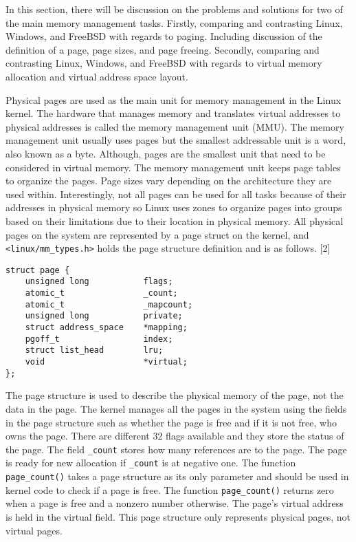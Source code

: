 \documentclass[letterpaper,10pt,draftclsnofoot,onecolumn,]{IEEEtran}
\begin{document}

In this section, there will be discussion on the problems and solutions for two of the main memory management tasks. Firstly, comparing and contrasting Linux, Windows, and FreeBSD with regards to paging. Including discussion of the definition of a page, page sizes, and page freeing. Secondly, comparing and contrasting Linux, Windows, and FreeBSD with regards to virtual memory allocation and virtual address space layout.

Physical pages are used as the main unit for memory management in the Linux kernel. The hardware that manages memory and translates virtual addresses to physical addresses is called the memory management unit (MMU). The memory management unit usually uses pages but the smallest addressable unit is a word, also known as a byte. Although, pages are the smallest unit that need to be considered in virtual memory. The memory management unit keeps page tables to organize the pages. Page sizes vary depending on the architecture they are used within. Interestingly, not all pages can be used for all tasks because of their addresses in physical memory so Linux uses zones to organize pages into groups based on their limitations due to their location in physical memory. All physical pages on the system are represented by a page struct on the kernel, and \verb|<linux/mm_types.h>| holds the page structure definition and is as follows. [2]
\begin{lstlisting}
struct page {
	unsigned long			flags;
    atomic_t				_count;
    atomic_t				_mapcount;
    unsigned long			private;
    struct address_space	*mapping;
    pgoff_t					index;
    struct list_head		lru;
    void					*virtual;
};
\end{lstlisting}
The page structure is used to describe the physical memory of the page, not the data in the page. The kernel manages all the pages in the system using the fields in the page structure such as whether the page is free and if it is not free, who owns the page. There are different 32 flags available and they store the status of the page. The field \verb|_count| stores how many references are to the page. The page is ready for new allocation if \verb|_count| is at negative one. The function \verb|page_count()| takes a page structure as its only parameter and should be used in kernel code to check if a page is free. The function \verb|page_count()| returns zero when a page is free and a nonzero number otherwise. The page's virtual address is held in the virtual field. This page structure only represents physical pages, not virtual pages. 
\end{document}
